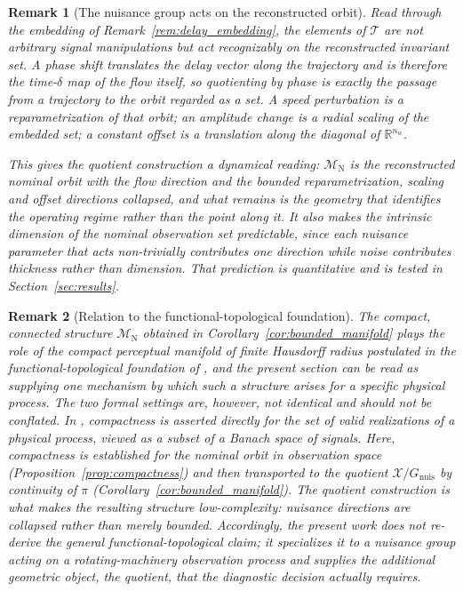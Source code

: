 \documentclass[a4paper]{cas-sc}
\newtheorem{remark}{Remark}
\newcommand{\Mnominal}{\ensuremath{\mathcal{M}_{\mathrm{N}}}}
\newcommand{\R}{\ensuremath{\mathbb{R}}}
\newcommand{\quotient}{\ensuremath{\mathcal{X}/G_{\mathrm{nuis}}}}
\begin{document}
\begin{remark}[The nuisance group acts on the reconstructed orbit]
\label{rem:nuisance_on_attractor}
Read through the embedding of Remark~\ref{rem:delay_embedding}, the elements
of \(\mathcal{T}\) are not arbitrary signal manipulations but act
recognizably on the reconstructed invariant set. A phase shift translates the
delay vector along the trajectory and is therefore the time-\(\delta\) map of
the flow itself, so quotienting by phase is exactly the passage from a
trajectory to the orbit regarded as a set. A speed perturbation is a
reparametrization of that orbit; an amplitude change is a radial scaling of
the embedded set; a constant offset is a translation along the diagonal of
\(\R^{n_w}\).

This gives the quotient construction a dynamical reading:
\(\Mnominal\) is the reconstructed nominal orbit with the flow direction and
the bounded reparametrization, scaling and offset directions collapsed, and
what remains is the geometry that identifies the operating regime rather than
the point along it. It also makes the intrinsic dimension of the nominal
observation set predictable, since each nuisance parameter that acts
non-trivially contributes one direction while noise contributes thickness
rather than dimension. That prediction is quantitative and is tested in
Section~\ref{sec:results}.
\end{remark}

\begin{remark}[Relation to the functional-topological foundation]
\label{rem:blueprints_relation}
The compact, connected structure \(\Mnominal\) obtained in
Corollary~\ref{cor:bounded_manifold} plays the role of the compact
perceptual manifold of finite Hausdorff radius postulated in the
functional-topological foundation of \citet{disanti2026blueprints}, and the
present section can be read as supplying one mechanism by which such a
structure arises for a specific physical process. The two formal settings
are, however, not identical and should not be conflated. In
\citet{disanti2026blueprints}, compactness is asserted directly for the set
of valid realizations of a physical process, viewed as a subset of a Banach
space of signals. Here, compactness is established for the nominal orbit in
observation space (Proposition~\ref{prop:compactness}) and then transported
to the \emph{quotient} \(\quotient\) by continuity of \(\pi\)
(Corollary~\ref{cor:bounded_manifold}). The quotient construction is what
makes the resulting structure low-complexity: nuisance directions are
collapsed rather than merely bounded. Accordingly, the present work does
not re-derive the general functional-topological claim; it specializes it to
a nuisance group acting on a rotating-machinery observation process and
supplies the additional geometric object, the quotient, that the diagnostic
decision actually requires.
\end{remark}
\end{document}
